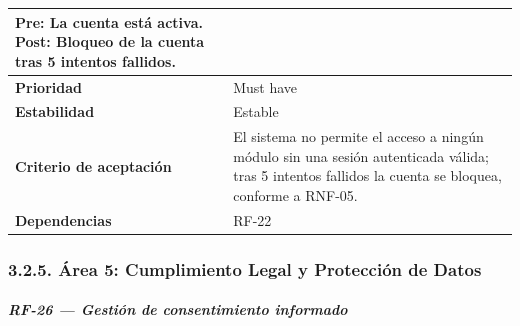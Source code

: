 \documentclass[
]{article}
\begin{document}
{\begin{longtable}[]{|
  >{\raggedright\arraybackslash}p{}|
  >{\raggedright\arraybackslash}p{}|}
\begin{minipage}[t]{\linewidth}
Pre: La cuenta está activa. Post: Bloqueo de la cuenta tras 5 intentos fallidos.
\end{minipage} \\
\hline
\textbf{Prioridad} & \begin{minipage}[t]{\linewidth}\raggedright
Must have
\end{minipage} \\
\hline
\textbf{Estabilidad} & \begin{minipage}[t]{\linewidth}\raggedright
Estable
\end{minipage} \\
\hline
\textbf{Criterio de aceptación} &
\begin{minipage}[t]{\linewidth}\raggedright
El sistema no permite el acceso a ningún módulo sin una sesión autenticada válida; tras 5 intentos fallidos la cuenta se bloquea, conforme a RNF-05.
\end{minipage} \\
\hline
\textbf{Dependencias} & \begin{minipage}[t]{\linewidth}\raggedright
RF-22
\end{minipage} \\
\hline
\end{longtable}
}

\subsubsection{3.2.5. Área 5: Cumplimiento Legal y Protección de Datos}\label{area-5-cumplimiento-legal}

\subparagraph{RF-26 --- Gestión de consentimiento informado}\label{rf-26-gesti-n-de-consentimiento-informado}
\end{document}
